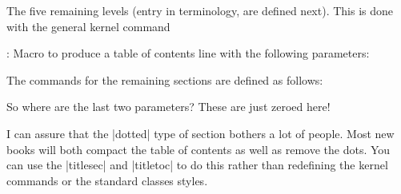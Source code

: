 \begin{teX}
\newcommand*\l@part[2]{%
  \ifnum \c@tocdepth >-2\relax
    \addpenalty{-\@highpenalty}%
    \addvspace{2.25em \@plus\p@}%
    \setlength\@tempdima{3em}%
    \begingroup
      \parindent \z@ \rightskip \@pnumwidth
      \parfillskip -\@pnumwidth
      {\leavevmode
       \large \bfseries #1\hfil \hb@xt@\@pnumwidth{\hss #2}}\par
       \nobreak
         \global\@nobreaktrue
         \everypar{\global\@nobreakfalse\everypar{}}%
    \endgroup
  \fi}

\newcommand*\l@chapter[2]{%
  \ifnum \c@tocdepth >\m@ne
    \addpenalty{-\@highpenalty}%
    \vskip 1.0em \@plus\p@
    \setlength\@tempdima{1.5em}%
    \begingroup
      \parindent \z@ \rightskip \@pnumwidth
      \parfillskip -\@pnumwidth
      \leavevmode \bfseries
      \advance\leftskip\@tempdima
      \hskip -\leftskip
      #1\nobreak\hfil \nobreak\hb@xt@\@pnumwidth{\hss #2}\par
      \penalty\@highpenalty
    \endgroup
  \fi}
\end{teX}


The five remaining levels (entry in \latex terminology, are defined next). This is done with the general \latex kernel command 

\begin{teX}
: Macro
to produce a table of contents line with the following parameters:
\end{teX}

The commands for the remaining sections are defined as follows:

\begin{teX}
\newcommand*\l@section{\@dottedtocline{1}{1.5em}{2.3em}}
\newcommand*\l@subsection{\@dottedtocline{2}{3.8em}{3.2em}}
\newcommand*\l@subsubsection{\@dottedtocline{3}{7.0em}{4.1em}}
\newcommand*\l@paragraph{\@dottedtocline{4}{10em}{5em}}
\newcommand*\l@subparagraph{\@dottedtocline{5}{12em}{6em}}
\end{teX}

So where are the last two parameters? These are just zeroed here!


I can assure that the |dotted| type of section bothers a lot of people. Most new books will both compact the table of contents as well as remove the dots. You can use the |titlesec| and |titletoc| to do this rather than redefining the kernel commands or the standard classes styles.

